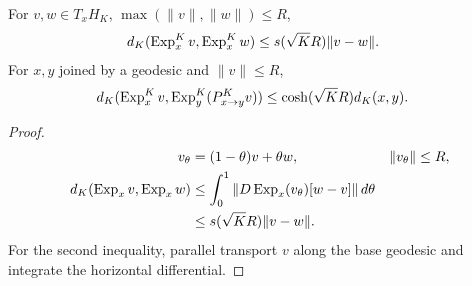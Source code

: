 \begin{corollary}
For $v,w\in T_xH_K$, $\max(\|v\|,\|w\|)\le R$,
\begin{align}\label{eq:velocity-lip}
 d_K(\operatorname{Exp}_x^Kv,\operatorname{Exp}_x^Kw)
 &\le s(\sqrt KR)\|v-w\|.
\end{align}
For $x,y$ joined by a geodesic and $\|v\|\le R$,
\begin{align}
 d_K(\operatorname{Exp}_x^Kv,\operatorname{Exp}_y^K(P_{x\to y}^Kv))
 &\le\cosh(\sqrt KR)d_K(x,y).
\end{align}
\end{corollary}
\begin{proof}
\begin{align}
 v_\theta&=(1-\theta)v+\theta w,&\|v_\theta\|&\le R,\\
 d_K(\operatorname{Exp}_xv,\operatorname{Exp}_xw)
 &\le\int_0^1\|D\operatorname{Exp}_x(v_\theta)[w-v]\|\,d\theta\\
 &\le s(\sqrt KR)\|v-w\|.
\end{align}
For the second inequality, parallel transport $v$ along the base geodesic and integrate the horizontal differential.
\end{proof}

